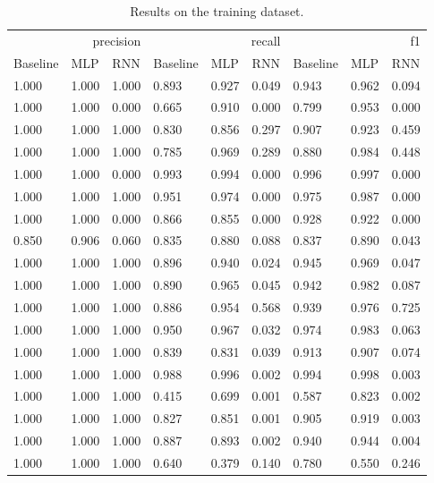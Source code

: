 \begin{table}
\caption{Results on the training dataset.}
\label{tab::ex_2_train}
\begin{tabular}{|l||l||l||l||l||l||l||l||l|}
\toprule
\multicolumn{3}{r}{precision} & \multicolumn{3}{r}{recall} & \multicolumn{3}{r}{f1} \\
Baseline & MLP & RNN & Baseline & MLP & RNN & Baseline & MLP & RNN \\
\midrule
1.000 & 1.000 & 1.000 & 0.893 & 0.927 & 0.049 & 0.943 & 0.962 & 0.094 \\
1.000 & 1.000 & 0.000 & 0.665 & 0.910 & 0.000 & 0.799 & 0.953 & 0.000 \\
1.000 & 1.000 & 1.000 & 0.830 & 0.856 & 0.297 & 0.907 & 0.923 & 0.459 \\
1.000 & 1.000 & 1.000 & 0.785 & 0.969 & 0.289 & 0.880 & 0.984 & 0.448 \\
1.000 & 1.000 & 0.000 & 0.993 & 0.994 & 0.000 & 0.996 & 0.997 & 0.000 \\
1.000 & 1.000 & 1.000 & 0.951 & 0.974 & 0.000 & 0.975 & 0.987 & 0.000 \\
1.000 & 1.000 & 0.000 & 0.866 & 0.855 & 0.000 & 0.928 & 0.922 & 0.000 \\
0.850 & 0.906 & 0.060 & 0.835 & 0.880 & 0.088 & 0.837 & 0.890 & 0.043 \\
1.000 & 1.000 & 1.000 & 0.896 & 0.940 & 0.024 & 0.945 & 0.969 & 0.047 \\
1.000 & 1.000 & 1.000 & 0.890 & 0.965 & 0.045 & 0.942 & 0.982 & 0.087 \\
1.000 & 1.000 & 1.000 & 0.886 & 0.954 & 0.568 & 0.939 & 0.976 & 0.725 \\
1.000 & 1.000 & 1.000 & 0.950 & 0.967 & 0.032 & 0.974 & 0.983 & 0.063 \\
1.000 & 1.000 & 1.000 & 0.839 & 0.831 & 0.039 & 0.913 & 0.907 & 0.074 \\
1.000 & 1.000 & 1.000 & 0.988 & 0.996 & 0.002 & 0.994 & 0.998 & 0.003 \\
1.000 & 1.000 & 1.000 & 0.415 & 0.699 & 0.001 & 0.587 & 0.823 & 0.002 \\
1.000 & 1.000 & 1.000 & 0.827 & 0.851 & 0.001 & 0.905 & 0.919 & 0.003 \\
1.000 & 1.000 & 1.000 & 0.887 & 0.893 & 0.002 & 0.940 & 0.944 & 0.004 \\
1.000 & 1.000 & 1.000 & 0.640 & 0.379 & 0.140 & 0.780 & 0.550 & 0.246 \\
\bottomrule
\end{tabular}
\end{table}
